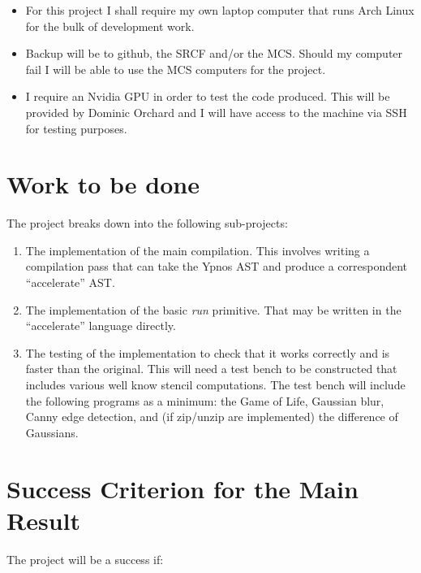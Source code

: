 \begin{itemize} 

\item For this project I shall require my own laptop computer that runs Arch 
Linux for the bulk of development work. 

\item Backup will be to github, the SRCF and/or the MCS. Should my computer 
fail I will be able to use the MCS computers for the project.

\item I require an Nvidia GPU in order to test the code produced. This will be 
provided by Dominic Orchard and I will have access to the machine via SSH for 
testing purposes.

\end{itemize}

\section*{Work to be done}

The project breaks down into the following sub-projects:

\begin{enumerate}

\item The implementation of the main compilation. This involves writing a 
compilation pass that can take the Ypnos AST and produce a correspondent 
``accelerate'' AST.

\item The implementation of the basic \emph{run} primitive. That may be written 
in the ``accelerate'' language directly.

\item The testing of the implementation to check that it works correctly and is 
faster than the original. This will need a test bench to be constructed that 
includes various well know stencil computations. The test bench will include 
the following programs as a minimum: the Game of Life, Gaussian blur, Canny 
edge detection, and (if zip/unzip are implemented) the difference of Gaussians.

\end{enumerate}

\section*{Success Criterion for the Main Result}

The project will be a success if:

